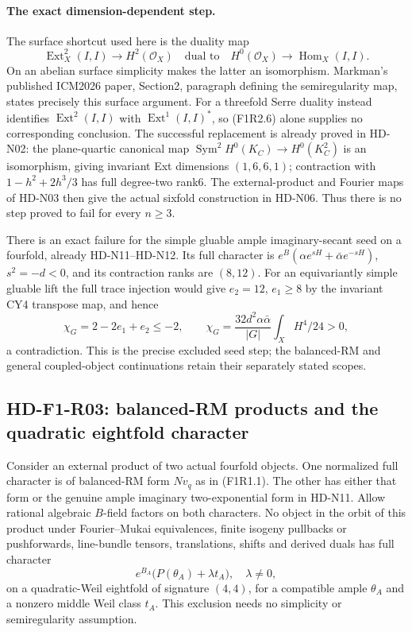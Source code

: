 \paragraph{The exact dimension-dependent step.}
The surface shortcut used here is the duality map
\[
 \operatorname{Ext}^2_X(I,I)\longrightarrow H^2(\mathcal O_X)
 \quad\text{dual to}\quad
 H^0(\mathcal O_X)\longrightarrow\operatorname{Hom}_X(I,I).
 \tag{F1R2.6}
\]
On an abelian surface simplicity makes the latter an
isomorphism. Markman's published ICM2026 paper, Section2,
paragraph defining the semiregularity map, states precisely
this surface argument. For a threefold Serre duality instead
identifies $\operatorname{Ext}^2(I,I)$ with
$\operatorname{Ext}^1(I,I)^*$, so (F1R2.6) alone supplies
no corresponding conclusion. The successful replacement is
already proved in HD-N02: the plane-quartic canonical map
$\operatorname{Sym}^2H^0(K_C)\to H^0(K_C^2)$ is an
isomorphism, giving invariant Ext dimensions $(1,6,6,1)$;
contraction with $1-h^2+2h^3/3$ has full degree-two rank6.
The external-product and Fourier maps of HD-N03 then give
the actual sixfold construction in HD-N06. Thus there is
no step proved to fail for every $n\ge3$.

There is an exact failure for the simple gluable ample
imaginary-secant seed on a fourfold, already HD-N11--HD-N12.
Its full character is $e^B(\alpha e^{sH}+\bar\alpha e^{-sH})$,
$s^2=-d<0$, and its contraction ranks are $(8,12)$.
For an equivariantly simple gluable lift the full trace
injection would give $e_2=12$, $e_1\ge8$ by the invariant
CY4 transpose map, and hence
\[
 \chi_G=2-2e_1+e_2\le-2,
 \qquad
 \chi_G=\frac{32d^2\alpha\bar\alpha}{|G|}
                     \int_XH^4/24>0,
 \tag{F1R2.7}
\]
a contradiction. This is the precise excluded seed step;
the balanced-RM and general coupled-object continuations
retain their separately stated scopes.

\subsection{HD-F1-R03: balanced-RM products and the quadratic eightfold character}

Consider an external product of two actual fourfold objects.
One normalized full character is of balanced-RM form $Nv_q$ as in
(F1R1.1). The other has either that form or the genuine ample
imaginary two-exponential form in HD-N11. Allow rational algebraic
$B$-field factors on both characters. No object in the orbit of
this product under Fourier--Mukai equivalences, finite isogeny
pullbacks or pushforwards, line-bundle tensors, translations,
shifts and derived duals has full character
\[
 e^{B_A}\bigl(P(\theta_A)+\lambda t_A\bigr),\quad\lambda\ne0,
 \tag{F1R3.1}
\]
on a quadratic-Weil eightfold of signature $(4,4)$, for a compatible
ample $\theta_A$ and a nonzero middle Weil class $t_A$.
This exclusion needs no simplicity or semiregularity assumption.

